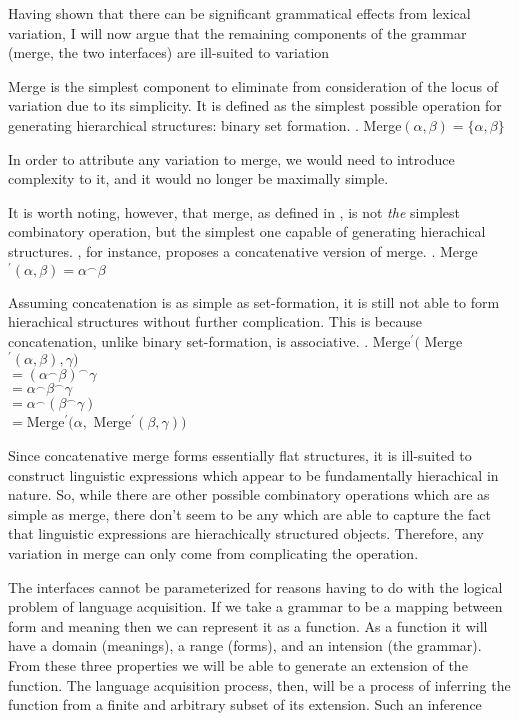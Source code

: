 \documentclass[MilwayThesis]{subfiles}
\begin{document}
Having shown that there can be significant grammatical effects from lexical variation, I will now argue that the remaining components of the grammar (merge, the two interfaces) are ill-suited to variation 

Merge is the simplest component to eliminate from consideration of the locus of variation due to its simplicity.
It is defined as the simplest possible operation for generating hierarchical structures: binary set formation.
\ex. Merge$(\alpha, \beta) = \{ \alpha, \beta\}$

In order to attribute any variation to merge, we would need to introduce complexity to it, and it would no longer be maximally simple.

It is worth noting, however, that merge, as defined in \Last, is not \textit{the} simplest combinatory operation, but the simplest one capable of generating hierachical structures.
\textcite{hornstein2009theory}, for instance, proposes a concatenative version of merge.
\ex. Merge$^\prime(\alpha, \beta) = \alpha^\frown\beta$

Assuming concatenation is as simple as set-formation, it is still not able to form hierachical structures without further complication.
This is because concatenation, unlike binary set-formation, is associative.
\ex. Merge$^\prime($ Merge$^\prime(\alpha, \beta), \gamma)$\\
$= (\alpha^\frown\beta)^\frown\gamma$\\
$= \alpha^\frown\beta^\frown\gamma$\\
$= \alpha^\frown(\beta^\frown\gamma)$\\
$= $Merge$^\prime(\alpha, $ Merge$^\prime(\beta, \gamma))$

Since concatenative merge forms essentially flat structures, it is ill-suited to construct linguistic expressions which appear to be fundamentally hierachical in nature.
So, while there are other possible combinatory operations which are as simple as merge, there don't seem to be any which are able to capture the fact that linguistic expressions are hierachically structured objects.
Therefore, any variation in merge can only come from complicating the operation.

The interfaces cannot be parameterized for reasons having to do with the logical problem of language acquisition.
If we take a grammar to be a mapping between form and meaning then we can represent it as a function.
As a function it will have a domain (meanings), a range (forms), and an intension (the grammar).
From these three properties we will be able to generate an extension of the function.
The language acquisition process, then, will be a process of inferring the function from a finite and arbitrary subset of its extension.
Such an inference 
\end{document}
